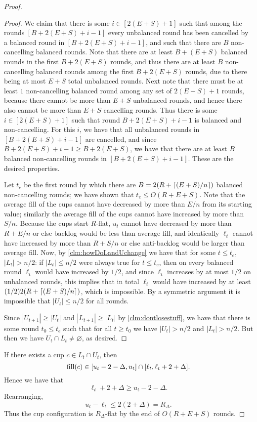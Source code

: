 \begin{proof}
\begin{proof}
  We claim that there is some $i \in [2(E+S)+1]$ such that among the
  rounds $[B + 2(E+S) + i-1]$ every unbalanced round has been
  cancelled by a balanced round in $[B + 2(E+S) + i-1]$, and such
  that there are $B$ non-cancelling balanced rounds. Note that there
  are at least $B + (E+S)$ balanced rounds in the first $B +
  2(E+S)$ rounds, and thus there are at least $B$ non-cancelling
  balanced rounds among the first $B+2(E+S)$ rounds, due to there
  being at most $E+S$ total unbalanced rounds. Next note that
  there must be at least $1$ non-cancelling balanced round among
  any set of $2(E+S) + 1$ rounds, because there cannot be more
  than $E+S$ unbalanced rounds, and hence there also cannot be
  more than $E+S$ cancelling rounds. Thus there is some $i \in
  [2(E+S)+1]$ such that round $B + 2(E+S) + i-1$ is balanced and
  non-cancelling. For this $i$, we have that all unbalanced
  rounds in $[B + 2(E+S) + i-1]$ are cancelled, and since $B +
  2(E+S) + i-1 \ge B + 2(E+S)$, we have that there are at least
  $B$ balanced non-cancelling rounds in $[B + 2(E+S) + i-1]$.
  These are the desired properties.

  Let $t_e$ be the first round by which there are $B = 2(R +
  \left\lceil (E+S)/n \right\rceil)$ balanced non-cancelling rounds; we have shown
  that $t_e \le O(R+E+S)$. Note that the average fill of the cups
  cannot have decreased by more than $E/n$ from its starting
  value; similarly the average fill of the cups cannot have
  increased by more than $S/n$. Because the cups start $R$-flat,
  $u_t$ cannot have decreased by more than $R + E/n$ or else
  backlog would be less than average fill, and identically
  $\ell_t$ cannot have increased by more than $R + S/n$ or else
  anti-backlog would be larger than average fill. Now, by
  \cref{clm:howDoLandUchange} we have that for some $t \le t_e$,
  $|L_t| > n/2$: if $|L_t|\le n/2$ were always true for $t\le
  t_e$, then on every balanced round $\ell_t$ would have
  increased by $1/2$, and since $\ell_t$ increases by at most
  $1/2$ on unbalanced rounds, this implies that in total $\ell_t$
  would have increased by at least $(1/2)2(R + \left\lceil (E+S)/n \right\rceil)$,
  which is impossible. By a symmetric argument it is impossible
  that $|U_t| \le n/2$ for all rounds. 

  Since $|U_{t+1}|\ge |U_t|$ and $|L_{t+1}| \ge |L_t|$ by
  \cref{clm:dontlosestuff}, we have that there is some round $t_0
  \le t_e$ such that for all $t \ge t_0$ we have $|U_t|> n/2$ and
  $|L_t|> n/2$. But then we have $U_t\cap L_t \neq \varnothing$, as desired.
  \end{proof}

  If there exists a cup $c \in L_t\cap U_t$, then 
  $$\operatorname{\text{\textup{fill}}}(c) \in [u_t-2-\Delta, u_t] \cap [\ell_t, \ell_t + 2 +
  \Delta].$$ Hence we have that $$\ell_t+2+\Delta \ge
  u_t-2-\Delta.$$ Rearranging, $$u_t - \ell_t \le 2(2+\Delta) =
  R_\Delta.$$ Thus the cup configuration is $R_\Delta$-flat by
  the end of $O(R+E+S)$ rounds.

\end{proof}

